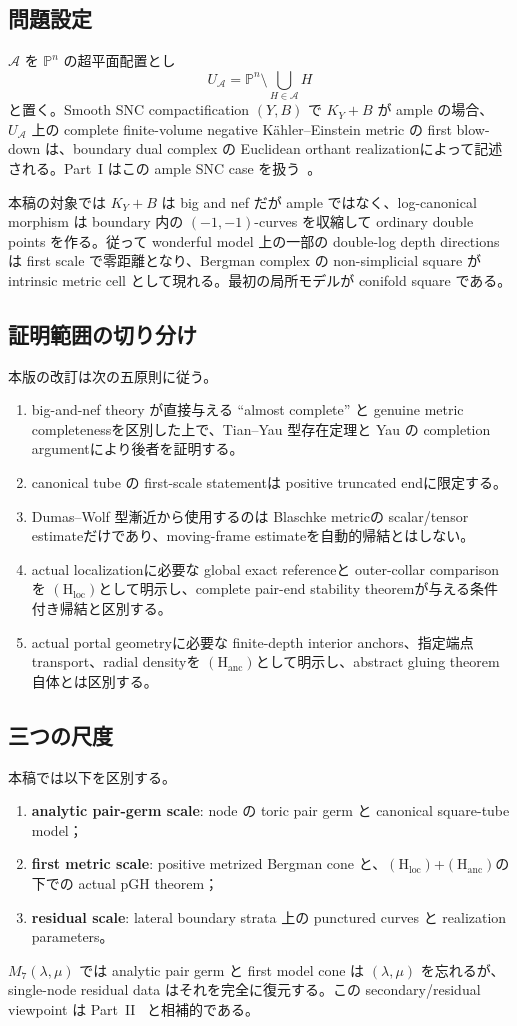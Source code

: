 \documentclass[11pt,a4paper]{ltjsarticle}
\newcommand{\PP}{\mathbb P}\newcommand{\RR}{\mathbb R}\newcommand{\CC}{\mathbb C}
\newcommand{\cA}{\mathcal A}\newcommand{\cB}{\mathcal B}\newcommand{\cC}{\mathcal C}
\newcommand{\Hloc}{\ensuremath{(\mathrm H_{\mathrm{loc}})}}
\newcommand{\Hanc}{\ensuremath{(\mathrm H_{\mathrm{anc}})}}
\theoremstyle{plain}
\theoremstyle{definition}
\theoremstyle{remark}
\begin{document}
\subsection{問題設定}
$\cA$ を $\PP^n$ の超平面配置とし
\[
 U_{\cA}=\PP^n\setminus\bigcup_{H\in\cA}H
\]
と置く。Smooth SNC compactification $(Y,B)$ で $K_Y+B$ が ample の場合、$U_{\cA}$ 上の complete finite-volume negative K\"ahler--Einstein metric の first blow-down は、boundary dual complex の Euclidean orthant realizationによって記述される。Part~I はこの ample SNC case を扱う~\cite{UedaI}。

本稿の対象では $K_Y+B$ は big and nef だが ample ではなく、log-canonical morphism は boundary 内の $(-1,-1)$-curves を収縮して ordinary double points を作る。従って wonderful model 上の一部の double-log depth directions は first scale で零距離となり、Bergman complex の non-simplicial square が intrinsic metric cell として現れる。最初の局所モデルが conifold square である。

\subsection{証明範囲の切り分け}
本版の改訂は次の五原則に従う。
\begin{enumerate}[label=(\roman*)]
 \item big-and-nef theory が直接与える ``almost complete'' と genuine metric completenessを区別した上で、Tian--Yau 型存在定理と Yau の completion argumentにより後者を証明する。
 \item canonical tube の first-scale statementは positive truncated endに限定する。
 \item Dumas--Wolf 型漸近から使用するのは Blaschke metricの scalar/tensor estimateだけであり、moving-frame estimateを自動的帰結とはしない。
 \item actual localizationに必要な global exact referenceと outer-collar comparisonを \Hloc として明示し、complete pair-end stability theoremが与える条件付き帰結と区別する。
 \item actual portal geometryに必要な finite-depth interior anchors、指定端点 transport、radial densityを \Hanc として明示し、abstract gluing theorem自体とは区別する。
\end{enumerate}

\subsection{三つの尺度}
本稿では以下を区別する。
\begin{enumerate}[label=(\roman*)]
 \item \textbf{analytic pair-germ scale}: node の toric pair germ と canonical square-tube model；
 \item \textbf{first metric scale}: positive metrized Bergman cone と、\Hloc+\Hanc の下での actual pGH theorem；
 \item \textbf{residual scale}: lateral boundary strata 上の punctured curves と realization parameters。
\end{enumerate}
$M_7(\lambda,\mu)$ では analytic pair germ と first model cone は $(\lambda,\mu)$ を忘れるが、single-node residual data はそれを完全に復元する。この secondary/residual viewpoint は Part~II~\cite{UedaII} と相補的である。
\end{document}
